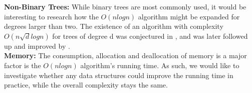 \noindent\textbf{Non-Binary Trees:} While binary trees are most commonly used, it would be interesting to research how the $O(nlogn)$ algorithm might be expanded for degrees larger than two. The existence of an algorithm with complexity $O(n\sqrt{d}logn)$ for trees of degree d was conjectured in \cite{nlogn}, and was later followed up and improved by \cite{FastMatch}. \\

\noindent\textbf{Memory:} The consumption, allocation and deallocation of memory is a major factor is the $O(nlogn)$ algorithm's running time. As such, we would like to investigate whether any data structures could improve the running time in practice, while the overall complexity stays the same. 
